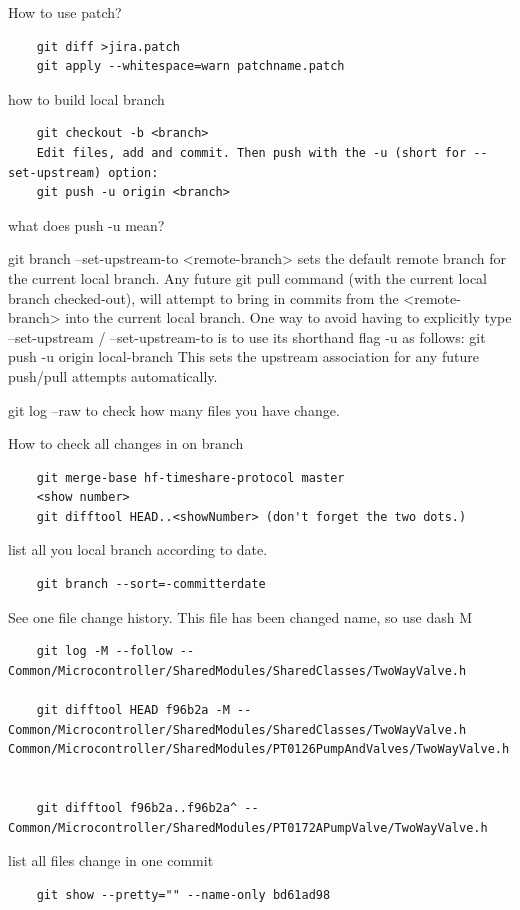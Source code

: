 \documentclass[paper=8.5in:11in, twoside, 12pt, pagesize=pdftex]{book}
\begin{document}
How to use patch? 
\begin{lstlisting}
	git diff >jira.patch
	git apply --whitespace=warn patchname.patch 
\end{lstlisting}

how to build local branch
\begin{lstlisting}
	git checkout -b <branch>
	Edit files, add and commit. Then push with the -u (short for --set-upstream) option:
	git push -u origin <branch>
\end{lstlisting}

what does push -u mean? 

git branch --set-upstream-to <remote-branch>
sets the default remote branch for the current local branch.
Any future git pull command (with the current local branch checked-out),
will attempt to bring in commits from the <remote-branch> into the current local branch.
One way to avoid having to explicitly type --set-upstream / --set-upstream-to is to use its shorthand flag -u as follows:
git push -u origin local-branch
This sets the upstream association for any future push/pull attempts automatically.

git log --raw to check how many files you have change. 

How to check all changes in on branch
\begin{lstlisting}
	git merge-base hf-timeshare-protocol master
	<show number>
	git difftool HEAD..<showNumber> (don't forget the two dots.)
\end{lstlisting}

list all you local branch according to date. 
\begin{lstlisting}
	git branch --sort=-committerdate
\end{lstlisting}

See one file change history. This file has been changed name, so use dash M
\begin{lstlisting}
	git log -M --follow -- Common/Microcontroller/SharedModules/SharedClasses/TwoWayValve.h
	
	git difftool HEAD f96b2a -M -- Common/Microcontroller/SharedModules/SharedClasses/TwoWayValve.h Common/Microcontroller/SharedModules/PT0126PumpAndValves/TwoWayValve.h
	
	
	git difftool f96b2a..f96b2a^ -- Common/Microcontroller/SharedModules/PT0172APumpValve/TwoWayValve.h	
\end{lstlisting}

list all files change in one commit 
\begin{lstlisting}
	git show --pretty="" --name-only bd61ad98 
\end{lstlisting}
\end{document}
